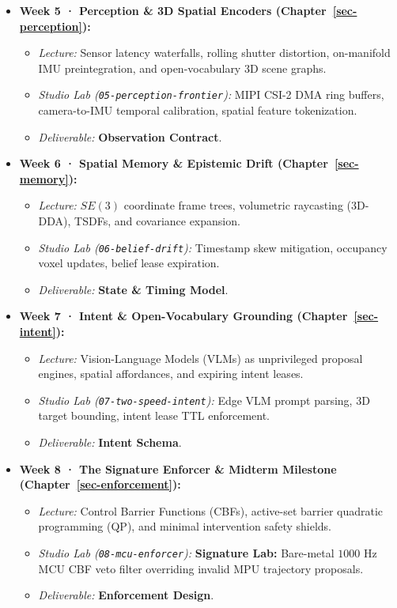 \documentclass[
  10pt,
  letterpaper,
  twoside,
  openright,
  numbers=noenddot,
  headings=standardclasses
]{scrbook}
\begin{document}
\begin{itemize}
\tightlist
\item
  \textbf{Week 5 · Perception \& 3D Spatial Encoders
  (Chapter~\ref{sec-perception}):}

  \begin{itemize}
  \tightlist
  \item
    \emph{Lecture:} Sensor latency waterfalls, rolling shutter
    distortion, on-manifold IMU preintegration, and open-vocabulary 3D
    scene graphs.
  \item
    \emph{Studio Lab (\texttt{05-perception-frontier}):} MIPI CSI-2 DMA
    ring buffers, camera-to-IMU temporal calibration, spatial feature
    tokenization.
  \item
    \emph{Deliverable:} \textbf{Observation Contract}.
  \end{itemize}
\item
  \textbf{Week 6 · Spatial Memory \& Epistemic Drift
  (Chapter~\ref{sec-memory}):}

  \begin{itemize}
  \tightlist
  \item
    \emph{Lecture:} \(SE(3)\) coordinate frame trees, volumetric
    raycasting (3D-DDA), TSDFs, and covariance expansion.
  \item
    \emph{Studio Lab (\texttt{06-belief-drift}):} Timestamp skew
    mitigation, occupancy voxel updates, belief lease expiration.
  \item
    \emph{Deliverable:} \textbf{State \& Timing Model}.
  \end{itemize}
\item
  \textbf{Week 7 · Intent \& Open-Vocabulary Grounding
  (Chapter~\ref{sec-intent}):}

  \begin{itemize}
  \tightlist
  \item
    \emph{Lecture:} Vision-Language Models (VLMs) as unprivileged
    proposal engines, spatial affordances, and expiring intent leases.
  \item
    \emph{Studio Lab (\texttt{07-two-speed-intent}):} Edge VLM prompt
    parsing, 3D target bounding, intent lease TTL enforcement.
  \item
    \emph{Deliverable:} \textbf{Intent Schema}.
  \end{itemize}
\item
  \textbf{Week 8 · The Signature Enforcer \& Midterm Milestone
  (Chapter~\ref{sec-enforcement}):}

  \begin{itemize}
  \tightlist
  \item
    \emph{Lecture:} Control Barrier Functions (CBFs), active-set barrier
    quadratic programming (QP), and minimal intervention safety shields.
  \item
    \emph{Studio Lab (\texttt{08-mcu-enforcer}):} \textbf{Signature
    Lab:} Bare-metal \(1000\text{ Hz}\) MCU CBF veto filter overriding
    invalid MPU trajectory proposals.
  \item
    \emph{Deliverable:} \textbf{Enforcement Design}.
  \end{itemize}
\end{itemize}
\end{document}
